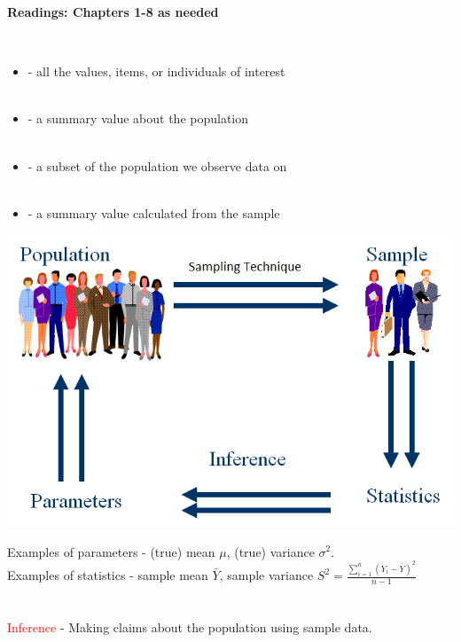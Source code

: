 \begin{center}\Large\textbf{Readings: Chapters 1-8 as needed}\\
\normalsize \end{center}
~\hrulefill~\\
\begin{itemize}
\item \textcolor{red}{}
- all the values, items, or individuals of interest\\~\\

\item \textcolor{red}{}
- a summary value about the population\\~\\

\item \textcolor{red}{}
- a subset of the population we observe data on\\~\\

\item \textcolor{red}{}
- a summary value calculated from the sample
\end{itemize}

\begin{center}
\includegraphics[scale=0.35]{paradigm}
\end{center}
{Examples of parameters - (true) mean $\mu$, (true) variance $\sigma^2$.\\
Examples of statistics - sample mean $\bar{Y}$, sample variance $S^2=\frac{\sum_{i=1}^{n}(Y_i-\bar{Y})^2}{n-1}$}\\~\\~\\
\textcolor{red}{Inference}
- Making claims about the population using sample data.

